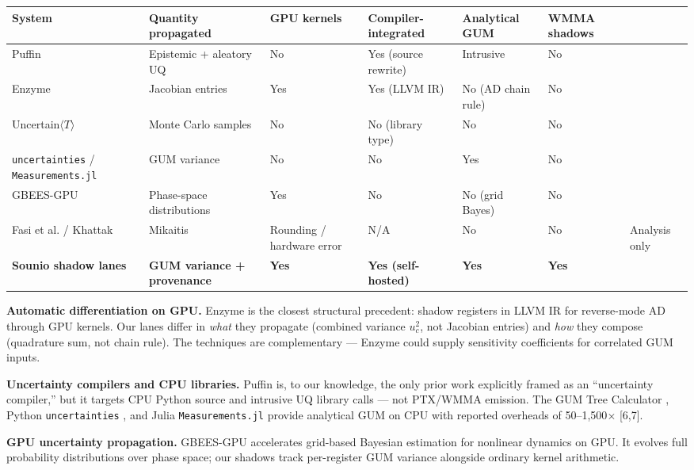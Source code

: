 \documentclass[11pt]{article}
\begin{document}
{{\begin{table}[t]\centering
\begin{tabular}{llllll}
\toprule
System & Quantity propagated & GPU kernels & Compiler-integrated & Analytical GUM & WMMA shadows \\
\midrule
Puffin \cite{puffin2021} & Epistemic + aleatory UQ & No & Yes (source rewrite) & Intrusive & No \\
Enzyme \cite{enzyme2021} & Jacobian entries & Yes & Yes (LLVM IR) & No (AD chain rule) & No \\
Uncertain$\langle T \rangle$ \cite{uncertaint2014} & Monte Carlo samples & No & No (library type) & No & No \\
\texttt{uncertainties} \cite{uncertainties} / \texttt{Measurements.jl} \cite{measurementsjl} & GUM variance & No & No & Yes & No \\
GBEES-GPU \cite{gbeesgpu2025} & Phase-space distributions & Yes & No & No (grid Bayes) & No \\
Fasi et al. \cite{fasi2021} / Khattak & Mikaitis \cite{khattak2025} & Rounding / hardware error & N/A & No & No & Analysis only \\
\textbf{Sounio shadow lanes} & \textbf{GUM variance + provenance} & \textbf{Yes} & \textbf{Yes (self-hosted)} & \textbf{Yes} & \textbf{Yes} \\
\bottomrule
\end{tabular}
\end{table}

\textbf{Automatic differentiation on GPU.} Enzyme \cite{enzyme2021} is the closest structural precedent: shadow registers in LLVM IR for reverse-mode AD through GPU kernels. Our lanes differ in \emph{what} they propagate (combined variance $u_c^2$, not Jacobian entries) and \emph{how} they compose (quadrature sum, not chain rule). The techniques are complementary --- Enzyme could supply sensitivity coefficients for correlated GUM inputs.

\textbf{Uncertainty compilers and CPU libraries.} Puffin \cite{puffin2021} is, to our knowledge, the only prior work explicitly framed as an “uncertainty compiler,” but it targets CPU Python source and intrusive UQ library calls --- not PTX/WMMA emission. The GUM Tree Calculator \cite{gtc}, Python \texttt{uncertainties} \cite{uncertainties}, and Julia \texttt{Measurements.jl} \cite{measurementsjl} provide analytical GUM on CPU with reported overheads of 50–1,500$\times$ [6,7].

\textbf{GPU uncertainty propagation.} GBEES-GPU \cite{gbeesgpu2025} accelerates grid-based Bayesian estimation for nonlinear dynamics on GPU. It evolves full probability distributions over phase space; our shadows track per-register GUM variance alongside ordinary kernel arithmetic.

}}
\end{document}
